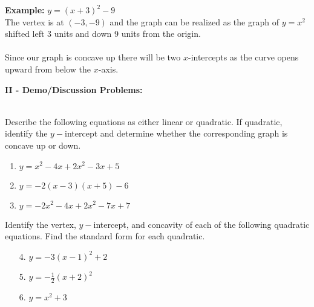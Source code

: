\documentclass[12pt]{article}
\theoremstyle{definition}
\begin{document}
\begin{multicols}{2}
{\bf Example:} $y = (x+3)^2-9$\\

The vertex is at $(-3,-9)$ and the graph can be realized as the graph of $y=x^2$ shifted left 3 units and down 9 units from the origin.\\ \\  
Since our graph is concave up there will be two $x$-intercepts as the curve opens upward from below the $x$-axis.

\columnbreak

\begin{center}
\end{center}
\end{multicols}
{\bf II - Demo/Discussion Problems:}\\
\ \par
Describe the following equations as either linear or quadratic.  If quadratic, identify the $y-$intercept and determine whether the corresponding graph is concave up or down.
\begin{enumerate}
	\item $y=x^2-4x+2x^2-3x+5$
	\item $y=-2(x-3)(x+5)-6$
	\item $y=-2x^2-4x+2x^2-7x+7$
\end{enumerate}
\newpage
Identify the vertex, $y-$intercept, and concavity of each of the following quadratic equations.  Find the standard form for each quadratic.
\begin{multicols}{3}
\begin{enumerate}
	\item[4.] $y=-3(x-1)^2+2$
	\item[5.] $y=-\frac{1}{2}(x+2)^2$
	\item[6.] $y=x^2+3$
\end{enumerate}
\end{multicols}
\end{document}

